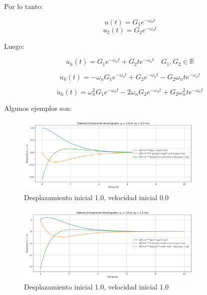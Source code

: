 \documentclass{article}  %
\begin{document}
Por lo tanto:

\begin{equation}
    u(t) = G_1e^{-\omega_n t} 
\end{equation}
\begin{equation}
    u_2(t) = G_2e^{-\omega_n t}
\end{equation}

Luego:

\begin{equation}
    u_h(t) = G_1e^{-\omega_n t} + G_2te^{-\omega_n t} \quad G_1, G_2 \in \mathbb{R}
\end{equation}

\begin{equation}
    \dot{u}_h(t) = -\omega_n G_1e^{-\omega_n t} + G_2e^{-\omega_n t} - G_2\omega_n te^{-\omega_n t}
\end{equation}

\begin{equation}
    \ddot{u}_h(t) = \omega_n^2 G_1e^{-\omega_n t} - 2\omega_n G_2e^{-\omega_n t} + G_2\omega_n^2 te^{-\omega_n t}
\end{equation}

Algunos ejemplos son:
\begin{figure}[H]
    \centering
    \includegraphics[width=0.8\textwidth]{GRAFICOS/sis_criticamente_amortiguado_u0_1.0_v0_0.0.png}
    \caption{Desplazamiento inicial 1.0, velocidad inicial 0.0}
    \label{fig:ejemplo1}
\end{figure}

\begin{figure}[H]
    \centering
    \includegraphics[width=0.8\textwidth]{GRAFICOS/sis_criticamente_amortiguado_u0_1.0_v0_1.0.png}
    \caption{Desplazamiento inicial 1.0, velocidad inicial 1.0}
    \label{fig:ejemplo1}
\end{figure}
\end{document}
